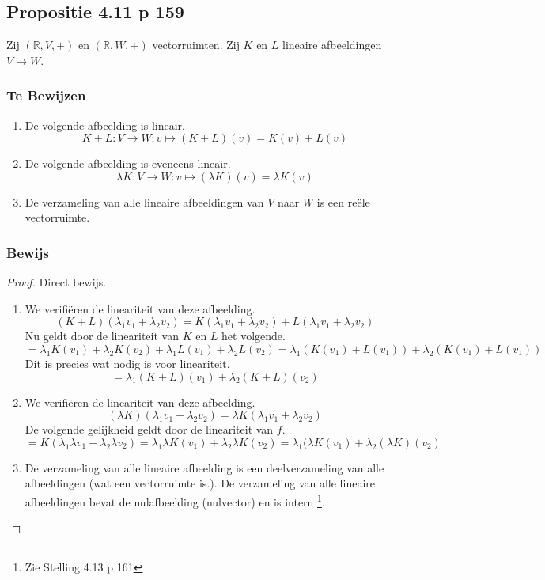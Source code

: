 \documentclass[lineaire_algebra_oplossingen.tex]{subfiles}
\begin{document}
\subsection{Propositie 4.11 p 159}
\label{4.11}
Zij $(\mathbb{R},V,+)$ en $(\mathbb{R},W,+)$ vectorruimten. Zij $K$ en $L$ lineaire afbeeldingen $V\rightarrow W$.

\subsubsection*{Te Bewijzen}
\begin{enumerate}
\item De volgende afbeelding is lineair.
\[K+L: V \rightarrow W: v\mapsto(K+L)(v)=K(v)+L(v)\]
\item De volgende afbeelding is eveneens lineair.
\[\lambda K: V\rightarrow W: v\mapsto (\lambda K)(v) = \lambda K(v)\]
\item De verzameling van alle lineaire afbeeldingen van $V$ naar $W$ is een re\"ele vectorruimte.
\end{enumerate}
\subsubsection*{Bewijs}
\begin{proof}
Direct bewijs.
\begin{enumerate}
\item
We verifi\"eren de lineariteit van deze afbeelding.
\[
(K+L)(\lambda_1v_1+\lambda_2v_2) = K(\lambda_1v_1+\lambda_2v_2) + L(\lambda_1v_1+\lambda_2v_2)
\]
Nu geldt door de lineariteit van $K$ en $L$ het volgende.
\[
= \lambda_1K(v_1)+\lambda_2K(v_2) + \lambda_1L(v_1)+\lambda_2L(v_2) = \lambda_1(K(v_1)+L(v_1)) + \lambda_2(K(v_1)+L(v_1))
\]
Dit is precies wat nodig is voor lineariteit.
\[
= \lambda_1(K+L)(v_1)+\lambda_2(K+L)(v_2)
\]

\item
We verifi\"eren de lineariteit van deze afbeelding.
\[
(\lambda K)(\lambda_1v_1+\lambda_2v_2) = \lambda K(\lambda_1v_1+\lambda_2v_2)
\]
De volgende gelijkheid geldt door de lineariteit van $f$. 
\[
=  K(\lambda_1\lambda v_1+\lambda_2\lambda v_2) = \lambda_1\lambda K(v_1)+\lambda_2\lambda K(v_2) = 
\lambda_1(\lambda K(v_1)+\lambda_2(\lambda K)(v_2)
\]

\item
De verzameling van alle lineaire afbeelding is een deelverzameling van alle afbeeldingen (wat een vectorruimte is.). De verzameling van alle lineaire afbeeldingen bevat de nulafbeelding (nulvector) en is intern \footnote{Zie Stelling 4.13 p 161}.

\end{enumerate}
\end{proof}
\end{document}
